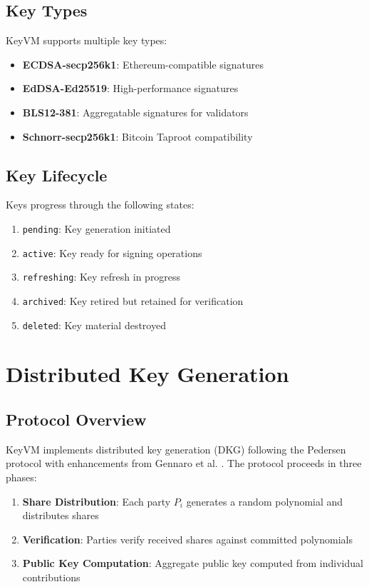 \documentclass[11pt,twocolumn]{article}
\begin{document}
\subsection{Key Types}

KeyVM supports multiple key types:

\begin{itemize}
\item \textbf{ECDSA-secp256k1}: Ethereum-compatible signatures
\item \textbf{EdDSA-Ed25519}: High-performance signatures
\item \textbf{BLS12-381}: Aggregatable signatures for validators
\item \textbf{Schnorr-secp256k1}: Bitcoin Taproot compatibility
\end{itemize}

\subsection{Key Lifecycle}

Keys progress through the following states:

\begin{enumerate}
\item \texttt{pending}: Key generation initiated
\item \texttt{active}: Key ready for signing operations
\item \texttt{refreshing}: Key refresh in progress
\item \texttt{archived}: Key retired but retained for verification
\item \texttt{deleted}: Key material destroyed
\end{enumerate}

\section{Distributed Key Generation}

\subsection{Protocol Overview}

KeyVM implements distributed key generation (DKG) following the Pedersen protocol \cite{pedersen1991threshold} with enhancements from Gennaro et al. \cite{gennaro2007secure}. The protocol proceeds in three phases:

\begin{enumerate}
\item \textbf{Share Distribution}: Each party $P_i$ generates a random polynomial and distributes shares
\item \textbf{Verification}: Parties verify received shares against committed polynomials
\item \textbf{Public Key Computation}: Aggregate public key computed from individual contributions
\end{enumerate}
\end{document}
